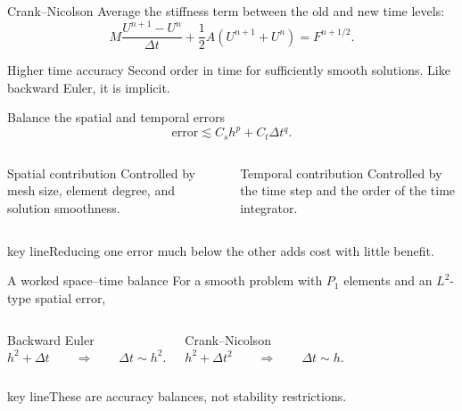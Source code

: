 \documentclass[aspectratio=169,11pt]{beamer}
\newcommand{\key}[1]{\par\vspace{4mm}\begin{beamercolorbox}[sep=2.5mm,wd=\textwidth]{key line}\normalsize #1\end{beamercolorbox}}
\begin{document}
\begin{frame}{Crank--Nicolson}
Average the stiffness term between the old and new time levels:\[
M\frac{U^{n+1}-U^n}{\Delta t}+\frac12A(U^{n+1}+U^n)=F^{n+1/2}.
\]\begin{exampleblock}{Higher time accuracy}
Second order in time for sufficiently smooth solutions. Like backward Euler, it is implicit.
\end{exampleblock}
\end{frame}

\begin{frame}{Balance the spatial and temporal errors}
\[
\text{error}\lesssim C_s h^p+C_t\Delta t^q.
\]\begin{columns}[c,onlytextwidth]
\begin{block}{Spatial contribution}
Controlled by mesh size, element degree, and solution smoothness.
\end{block}
\begin{exampleblock}{Temporal contribution}
Controlled by the time step and the order of the time integrator.
\end{exampleblock}
\end{columns}\key{Reducing one error much below the other adds cost with little benefit.}
\end{frame}

\begin{frame}{A worked space--time balance}
For a smooth problem with $P_1$ elements and an $L^2$-type spatial error,\begin{columns}[c,onlytextwidth]
\begin{block}{Backward Euler}
\[
h^2+\Delta t\qquad\Longrightarrow\qquad\Delta t\sim h^2.
\]
\end{block}
\begin{exampleblock}{Crank--Nicolson}
\[
h^2+\Delta t^2\qquad\Longrightarrow\qquad\Delta t\sim h.
\]
\end{exampleblock}
\end{columns}\key{These are accuracy balances, not stability restrictions.}
\end{frame}
\end{document}
